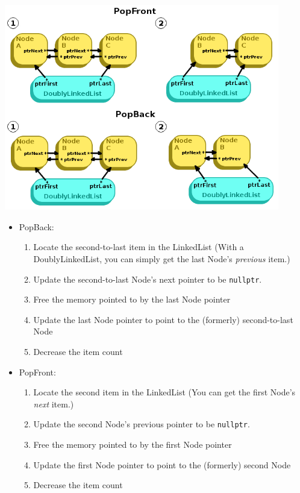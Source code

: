 \documentclass[a4paper,12pt,oneside]{book}
\begin{document}
            \begin{center}
                \includegraphics[height=9cm]{images/linkedlist-popping.png}
            \end{center}
    
            \begin{itemize}
                \item PopBack:
                \begin{enumerate}
                    \item Locate the second-to-last item in the LinkedList (With a DoublyLinkedList, you can
                        simply get the last Node's \textit{previous} item.)
                    \item Update the second-to-last Node's next pointer to be \texttt{nullptr}.
                    \item Free the memory pointed to by the last Node pointer
                    \item Update the last Node pointer to point to the (formerly) second-to-last Node
                    \item Decrease the item count
                \end{enumerate}
                
                \item PopFront:
                \begin{enumerate}
                    \item Locate the second item in the LinkedList (You can
                        get the first Node's \textit{next} item.)
                    \item Update the second Node's previous pointer to be \texttt{nullptr}.
                    \item Free the memory pointed to by the first Node pointer
                    \item Update the first Node pointer to point to the (formerly) second Node
                    \item Decrease the item count
                \end{enumerate}
            \end{itemize}
            
\end{document}

